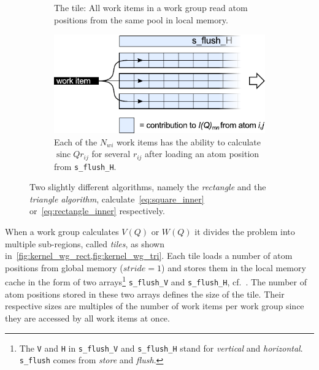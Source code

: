 \documentclass[11pt,twoside]{report}
\begin{document}
\begin{figure}[htbp]
\begin{subfigure}{0.47\textwidth}
	  \caption{The tile:  All work items in a work group read atom positions from the same pool in local memory.}
	  \label{fig:kernel_tile}	
	\end{subfigure}
	\hspace{5mm}
	\begin{subfigure}{0.47\textwidth}
	  \includegraphics[width=\textwidth]{img/kernel_wi.pdf}
	  \caption{Each of the $N_{wi}$ work items has the ability to calculate $\operatorname{sinc}{Qr_{ij}}$ for several $r_{ij}$ after loading an atom position from  {\tt s\_flush\_H}.}
	  \label{fig:kernel_wi}	
	\end{subfigure}
	\caption{ Two slightly different algorithms, namely the {\it rectangle} and the {\it triangle algorithm}, calculate~\cref{eq:square_inner} or~\cref{eq:rectangle_inner} respectively.}
\end{figure}

\indent When a work group calculates $V(Q)$ or $W(Q)$ it divides the problem into multiple sub-regions, called {\it tiles}, as shown in~\cref{fig:kernel_wg_rect,fig:kernel_wg_tri}. Each tile loads a number of atom positions from global memory ($stride = 1$) and stores them in the local memory cache in the form of two arrays\footnote{The {\tt V} and {\tt H} in {\tt s\_flush\_V} and {\tt s\_flush\_H} stand for {\it vertical} and {\it horizontal}. {\tt s\_flush} comes from {\it store} and {\it flush}.} {\tt s\_flush\_V} and  {\tt s\_flush\_H}, cf.~\cite{gpugems}. The number of atom positions stored in these two arrays defines the size of the tile. Their respective sizes are multiples of the number of work items per work group since they are accessed by all work items at once.
\end{document}
